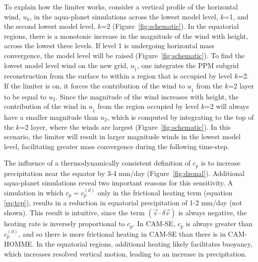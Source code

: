 To explain how the limiter works, consider a vertical profile of the horizontal wind, $u_k$, in the aqua-planet simulations across the lowest model level, $k$=1, and the second lowest model level, $k$=2 (Figure~\ref{fig:schematic}). In the equatorial regions, there is a monotonic increase in the magnitude of the wind with height, across the lowest three levels. If level 1 is undergoing horizontal mass convergence, the model level will be raised (Figure~\ref{fig:schematic}). To find the lowest model level wind on the new grid, $u_{\tilde 1}$, one integrates the PPM subgrid reconstruction from the surface to within a region that is occupied by level $k$=2. If the limiter is on, it forces the contribution of the wind to $u_{\tilde 1}$ from the $k$=2 layer to be equal to $u_2$. Since the magnitude of the wind increases with height, the contribution of the wind in $u_{\tilde 1}$ from the region occupied by level $k$=2 will always have a smaller magnitude than $u_2$, which is computed by integrating to the top of the $k$=2 layer, where the winds are largest (Figure~\ref{fig:schematic}). In this scenario, the limiter will result in larger magnitude winds in the lowest model level, facilitating greater mass convergence during the following time-step.    

The influence of a thermodynamically consistent definition of $c_p$ is to increase precipitation near the equator by 3-4 mm/day (Figure~\ref{fig:dzonal}). Additional aqua-planet simulations reveal two important reasons for this sensitivity. A simulation in which $c_p = c_p^{(d)}$ only in the frictional heating term (equation \eqref{eq:tcp}), results in a reduction in equatorial precipitation of 1-2 mm/day (not shown). This result is intuitive, since the term $\left(\vec{v}\cdot \delta \vec{v}\right)$ is always negative, the heating rate is inversely proportional to $c_p$. In CAM-SE, $c_p$ is always greater than $c_p^{(d)}$, and so there is more frictional heating in CAM-SE than there is in CAM-HOMME. In the equatorial regions, additional heating likely facilitates buoyancy, which increases resolved vertical motion, leading to an increase in precipitation.  

